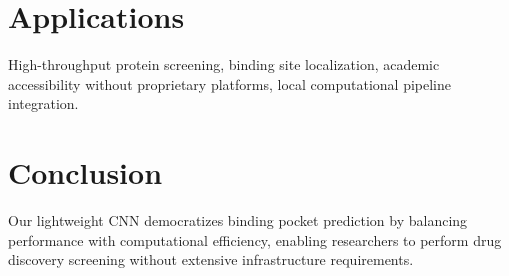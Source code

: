 \documentclass[11pt,a4paper]{article}
\begin{document}
\begin{multicols}{2}
\section{Applications}

High-throughput protein screening, binding site localization, academic accessibility without proprietary platforms, local computational pipeline integration.

\section{Conclusion}

Our lightweight CNN democratizes binding pocket prediction by balancing performance with computational efficiency, enabling researchers to perform drug discovery screening without extensive infrastructure requirements.

\end{multicols}
\end{document}
